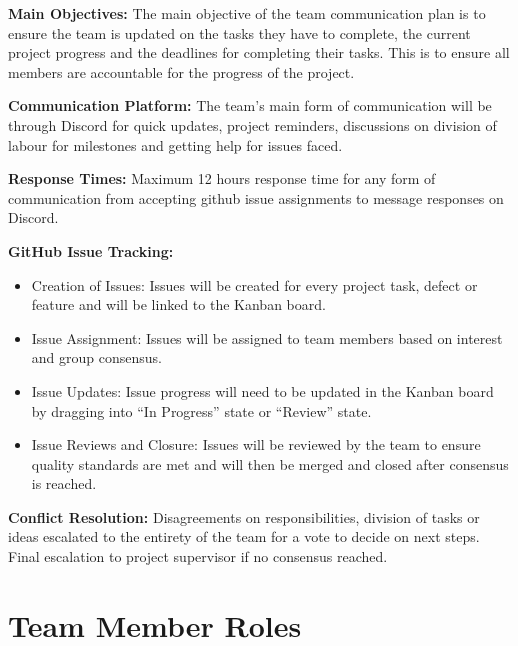 \documentclass{article}
\begin{document}
\begin{flushleft}
\textbf{Main Objectives:} The main objective of the team communication plan is to ensure the team is updated on the tasks they have to complete, the current project progress and the deadlines for completing their tasks. This is to ensure all members are accountable for the progress of the project.\vspace{1em}

\textbf{Communication Platform:} The team's main form of communication will be through Discord for quick updates, project reminders, discussions on division of labour for milestones and getting help for issues faced.\vspace{1em}

\textbf{Response Times:} Maximum 12 hours response time for any form of communication from accepting github issue assignments to message responses on Discord.\vspace{1em}

\textbf{GitHub Issue Tracking:}
\begin{itemize}
    \item Creation of Issues: Issues will be created for every project task, defect or feature and will be linked to the Kanban board.
    \item Issue Assignment: Issues will be assigned to team members based on interest and group consensus. 
    \item Issue Updates: Issue progress will need to be updated in the Kanban board by dragging into “In Progress” state or “Review” state.
    \item Issue Reviews and Closure: Issues will be reviewed by the team to ensure quality standards are met and will then be merged and closed after consensus is reached.
\end{itemize}

\textbf{Conflict Resolution:} Disagreements on responsibilities, division of tasks or ideas escalated to the entirety of the team for a vote to decide on next steps. Final escalation to project supervisor if no consensus reached.

\end{flushleft}


\section{Team Member Roles}

\end{document}
